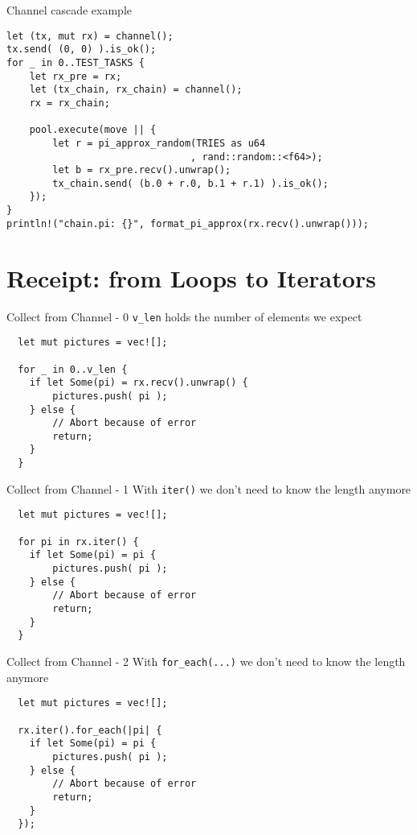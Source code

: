 \documentclass[aspectratio=1610,t]{beamer}
\begin{document}
\begin{frame}[fragile]{Channel cascade example}
\begin{verbatim}
let (tx, mut rx) = channel();
tx.send( (0, 0) ).is_ok();
for _ in 0..TEST_TASKS {
    let rx_pre = rx;
    let (tx_chain, rx_chain) = channel();
    rx = rx_chain;

    pool.execute(move || {
        let r = pi_approx_random(TRIES as u64
                                , rand::random::<f64>);
        let b = rx_pre.recv().unwrap();
        tx_chain.send( (b.0 + r.0, b.1 + r.1) ).is_ok();
    });
}
println!("chain.pi: {}", format_pi_approx(rx.recv().unwrap()));
\end{verbatim}
\end{frame}



{
\section{Receipt: from Loops to Iterators}
}
\begin{frame}[fragile]{Collect from Channel - 0}
\texttt{v\_len} holds the number of elements we expect
\begin{verbatim}
  let mut pictures = vec![];

  for _ in 0..v_len {
    if let Some(pi) = rx.recv().unwrap() {
        pictures.push( pi );
    } else {
        // Abort because of error
        return;
    }
  }
\end{verbatim}
\end{frame}

\begin{frame}[fragile]{Collect from Channel - 1}
With \texttt{iter()} we don't need to know the length anymore
\begin{verbatim}
  let mut pictures = vec![];

  for pi in rx.iter() {
    if let Some(pi) = pi {
        pictures.push( pi );
    } else {
        // Abort because of error
        return;
    }
  }
\end{verbatim}
\end{frame}

\begin{frame}[fragile]{Collect from Channel - 2}
With \texttt{for\_each(...)} we don't need to know the length anymore
\begin{verbatim}
  let mut pictures = vec![];

  rx.iter().for_each(|pi| {
    if let Some(pi) = pi {
        pictures.push( pi );
    } else {
        // Abort because of error
        return;
    }
  });
\end{verbatim}
\end{frame}
\end{document}
